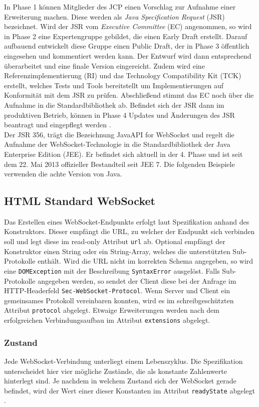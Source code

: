 \documentclass[11pt,a4paper,titlepage]{scrartcl}
\numberwithin{equation}{section}
\begin{document}
\noindent In Phase 1 können Mitglieder des JCP einen Vorschlag zur Aufnahme einer Erweiterung machen. Diese werden als \textit{Java Specification Request} (JSR) bezeichnet. Wird der JSR vom \textit{Executive Committee} (EC) angenommen, so wird in Phase 2 eine Expertengruppe gebildet, die einen Early Draft erstellt. Darauf aufbauend entwickelt diese Gruppe einen Public Draft, der in Phase 3 öffentlich eingesehen und kommentiert werden kann. Der Entwurf wird dann entsprechend überarbeitet und eine finale Version eingereicht. Zudem wird eine Referenzimplementierung (RI)  und das Technology Compatibility Kit (TCK) erstellt, welches Tests und Tools bereitstellt um Implementierungen auf Konformität mit dem JSR zu prüfen. Abschließend stimmt das EC noch über die Aufnahme in die Standardbibliothek ab. Befindet sich der JSR dann im produktiven Betrieb, können in Phase 4 Updates und Änderungen des JSR beantragt und eingepflegt werden \autocite{oracle_corporation_java_2017}.  \\

\noindent Der JSR 356, trägt die Bezeichnung Java\texttrademark API for WebSocket und regelt die Aufnahme der WebSocket-Technologie in die Standardbibliothek der Java Enterprise Edition (JEE). Er befindet sich aktuell in der 4. Phase und ist seit dem 22. Mai 2013 offizieller Bestandteil seit JEE 7. Die folgenden Beispiele verwenden die achte Version von Java.

\subsection{HTML Standard WebSocket }
\noindent Das Erstellen eines WebSocket-Endpunkts erfolgt laut Spezifikation anhand des Konstruktors. Dieser empfängt die URL, zu welcher der Endpunkt sich verbinden soll und legt diese im read-only Attribut \texttt{url} ab. Optional empfängt der Konstruktor einen String oder ein String-Array, welches die unterstützten Sub-Protokolle enthält. Wird die URL nicht im korrekten Schema angegeben, so wird eine \texttt{DOMException} mit der Beschreibung \texttt{SyntaxError} ausgelöst. Falls Sub-Protokolle angegeben werden, so sendet der Client diese bei der Anfrage im HTTP-Headerfeld \texttt{Sec-WebSocket-Protocol}. Wenn Server und Client ein gemeinsames Protokoll vereinbaren konnten, wird es im schreibgeschützten Attribut \texttt{protocol} abgelegt. Etwaige Erweiterungen werden nach dem erfolgreichen Verbindungsaufbau im Attribut \texttt{extensions} abgelegt.

\subsubsection{Zustand}
Jede WebSocket-Verbindung unterliegt einem Lebenszyklus. Die Spezifikation unterscheidet hier vier mögliche Zustände, die als konstante Zahlenwerte hinterlegt sind. Je nachdem in welchem Zustand sich der WebSocket gerade befindet, wird der Wert einer dieser Konstanten im Attribut \texttt{readyState} abgelegt \autocite{whatwg_html_2010}. 
\end{document}
